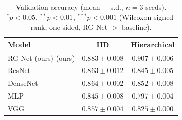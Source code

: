 \begin{table}[h]
\centering
\caption{Validation accuracy (mean $\pm$ s.d., $n=3$ seeds). $^\ast p<0.05$, $^{\ast\ast} p<0.01$, $^{\ast\ast\ast} p<0.001$ (Wilcoxon signed-rank, one-sided, RG-Net $>$ baseline).}
\label{tab:h3_accuracy}
\begin{tabular}{lcc}
\toprule
\textbf{Model} & \textbf{IID} & \textbf{Hierarchical} \\
\midrule
RG-Net (ours) (ours) & $0.883 \pm 0.008$ & $0.907 \pm 0.006$ \\
ResNet & $0.863 \pm 0.012$ & $0.845 \pm 0.005$ \\
DenseNet & $0.864 \pm 0.002$ & $0.852 \pm 0.008$ \\
MLP & $0.845 \pm 0.008$ & $0.797 \pm 0.004$ \\
VGG & $0.857 \pm 0.004$ & $0.825 \pm 0.000$ \\
\bottomrule
\end{tabular}
\end{table}
